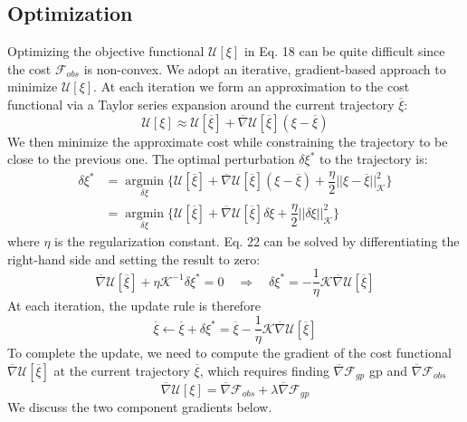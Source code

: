 \documentclass{IEEEtran}
\begin{document}
\subsection{Optimization}
Optimizing the objective functional $\mathcal{U}[\xi]$ in Eq. 18 can be
quite difficult since the cost $\mathcal{F}_{obs}$ is non-convex. We adopt an
iterative, gradient-based approach to minimize $\mathcal{U}[\xi]$. At each
iteration we form an approximation to the cost functional via
a Taylor series expansion around the current trajectory $\overline{\xi}$:
\begin{equation*}
\mathcal{U}[\xi]\approx\mathcal{U}[\overline{\xi}]+\overline{\nabla}\mathcal{U}[\overline{\xi}](\xi-\overline{\xi})\tag{21}
\end{equation*}
We then minimize the approximate cost while constraining
the trajectory to be close to the previous one. The optimal
perturbation $\delta\xi^*$
to the trajectory is:
\begin{equation}
\begin{split}
\delta\xi^*&=\mathop{\text{argmin}}\limits_{\delta\xi}\{\mathcal{U}[\overline\xi]+\overline{\nabla}\mathcal{U}[\overline{\xi}](\xi-\overline{\xi})+\dfrac{\eta}{2}||\xi-\overline{\xi}||_\mathcal{K}^2\}\\
&=\mathop{\text{argmin}}\limits_{\delta\xi}\{\mathcal{U}[\overline\xi]+\overline{\nabla}\mathcal{U}[\overline{\xi}]\delta\xi+\dfrac{\eta}{2}||\delta\xi||^2_\mathcal{K}\}
\end{split}
\tag{22}
\end{equation}
where $\eta$ is the regularization constant. Eq. 22 can be solved
by differentiating the right-hand side and setting the result
to zero:
\begin{equation*}
\overline{\nabla}\mathcal{U}[\overline{\xi}]+\eta\mathcal{K}^{-1}\delta\xi^*=0\quad\Longrightarrow\quad\delta\xi^*=-\dfrac{1}{\eta}\mathcal{K}\overline{\nabla}\mathcal{U}[\overline{\xi}]\tag{23}
\end{equation*}
At each iteration, the update rule is therefore
\begin{equation*}
\overline{\xi}\leftarrow\overline{\xi}+\delta\xi^*=\overline{\xi}-\dfrac{1}{\eta}\mathcal{K}\overline{\nabla}\mathcal{U}[\overline{\xi}]\tag{24}
\end{equation*}
To complete the update, we need to compute the gradient of
the cost functional $\overline{\nabla}\mathcal{U}[\overline{\xi}]$ at the current trajectory $\overline{\xi}$, which
requires finding $\overline{\nabla}\mathcal{F}_{gp}$
gp and $\overline{\nabla}\mathcal{F}_{obs}$
\begin{equation*}
\overline{\nabla}\mathcal{U}[\xi]=\overline{\nabla}\mathcal{F}_{obs}+\lambda\overline{\nabla}\mathcal{F}_{gp}\tag{25}
\end{equation*}
We discuss the two component gradients below.
\end{document}
